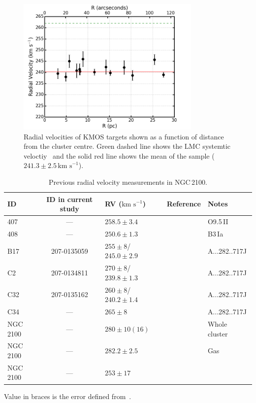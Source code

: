 \documentclass[useAMS,usenatbib]{mn2e}
\def\kms{$\mbox{km s}^{-1}$}
\begin{document}
\begin{figure}
 \includegraphics[width=9.0cm]{NGC2100-rv-v5}
 \caption{Radial velocities of KMOS targets shown as a function of distance from the cluster centre.
 Green dashed line shows the LMC systemtic veloctiy~\citep[$262.2\pm3.4$\,\kms;][]{2012AJ....144....4M}
 and the solid red line shows the mean of the sample ($241.3\pm2.5\,$\kms).
\label{fig:rvs}
          }
\end{figure}

\begin{table}
\caption{
        Previous radial velocity measurements in NGC\,2100.\label{tb:rvs}
        }
\scriptsize
\begin{center}
\begin{tabular}{lclll}
 \hline
 \hline
ID & ID in current study & RV (\kms) & Reference & Notes \\
 \hline
407 & ---         & $258.5\pm3.4$           & \cite{2015arXiv150803490E} &  O9.5\,II  \\
408 & ---         & $250.6\pm1.3$           & \cite{2015arXiv150803490E} &  B3\,Ia    \\
B17 & 207-0135059 & $255\pm8$/$245.0\pm2.9$ & {\cite{1994A&A...282..717J}} \\
C2  & 207-0134811 & $270\pm8$/$239.8\pm1.3$ & {\cite{1994A&A...282..717J}} & \\
C32 & 207-0135162 & $260\pm8$/$240.2\pm1.4$ & {\cite{1994A&A...282..717J}} & \\
C34 & ---         & $265\pm8$               & {\cite{1994A&A...282..717J}} & \\
NGC\,2100 & ---   & $280\pm10(16)$          & {\cite{1972MNRAS.159..445A}} & Whole cluster\\
NGC\,2100 & --- & $282.2\pm2.5$             & {\cite{1971ApJ...169..271S}} & Gas\\
NGC\,2100 & --- & $253\pm17$                & {\cite{1970PhD...........F}} & \\

\hline
\end{tabular}
\end{center}
{Value in braces is the error defined from~\cite{1983ApJ...272..488F}.}
\end{table}
\end{document}
